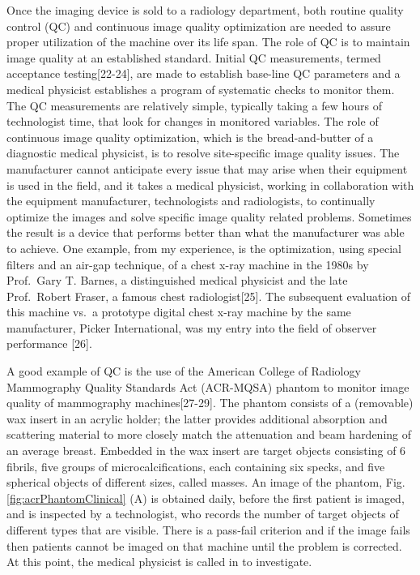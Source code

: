\documentclass[
]{book}
\begin{document}
Once the imaging device is sold to a radiology department, both routine quality control (QC) and continuous image quality optimization are needed to assure proper utilization of the machine over its life span. The role of QC is to maintain image quality at an established standard. Initial QC measurements, termed acceptance testing{[}22-24{]}, are made to establish base-line QC parameters and a medical physicist establishes a program of systematic checks to monitor them. The QC measurements are relatively simple, typically taking a few hours of technologist time, that look for changes in monitored variables. The role of continuous image quality optimization, which is the bread-and-butter of a diagnostic medical physicist, is to resolve site-specific image quality issues. The manufacturer cannot anticipate every issue that may arise when their equipment is used in the field, and it takes a medical physicist, working in collaboration with the equipment manufacturer, technologists and radiologists, to continually optimize the images and solve specific image quality related problems. Sometimes the result is a device that performs better than what the manufacturer was able to achieve. One example, from my experience, is the optimization, using special filters and an air-gap technique, of a chest x-ray machine in the 1980s by Prof.~Gary T. Barnes, a distinguished medical physicist and the late Prof.~Robert Fraser, a famous chest radiologist{[}25{]}. The subsequent evaluation of this machine vs.~a prototype digital chest x-ray machine by the same manufacturer, Picker International, was my entry into the field of observer performance {[}26{]}.

A good example of QC is the use of the American College of Radiology Mammography Quality Standards Act (ACR-MQSA) phantom to monitor image quality of mammography machines{[}27-29{]}. The phantom consists of a (removable) wax insert in an acrylic holder; the latter provides additional absorption and scattering material to more closely match the attenuation and beam hardening of an average breast. Embedded in the wax insert are target objects consisting of 6 fibrils, five groups of microcalcifications, each containing six specks, and five spherical objects of different sizes, called masses. An image of the phantom, Fig. \ref{fig:acrPhantomClinical} (A) is obtained daily, before the first patient is imaged, and is inspected by a technologist, who records the number of target objects of different types that are visible. There is a pass-fail criterion and if the image fails then patients cannot be imaged on that machine until the problem is corrected. At this point, the medical physicist is called in to investigate.
\end{document}
